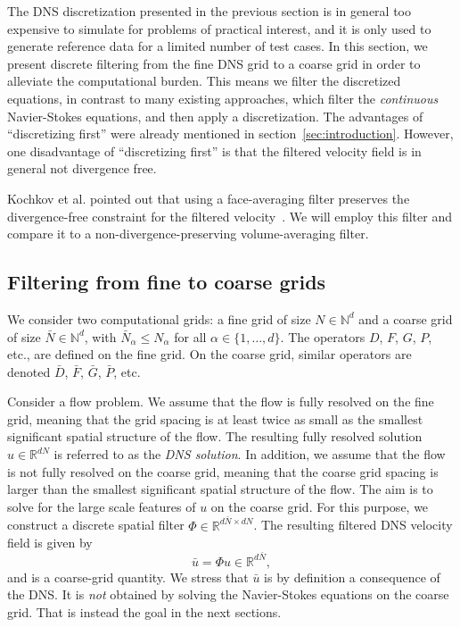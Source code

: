 \documentclass[preprint]{elsarticle}
\newcommand{\R}[1]{}
\newcommand{\revone}[1]{#1}
\begin{document}
The DNS discretization presented in the previous section is in general too
expensive to simulate for problems of practical interest, and it is only used to
generate reference data for a limited number of test cases. In this section, we
present discrete filtering from the fine DNS grid to a coarse grid in order to
alleviate the computational burden. This means we filter the discretized
equations, in contrast to many existing approaches, which filter the
\textit{continuous} Navier-Stokes equations, and then apply a discretization.
The advantages of ``discretizing first'' were already mentioned in
section~\ref{sec:introduction}.
However, one disadvantage of ``discretizing first'' is
that the filtered velocity field is in general not divergence free.
\R{novel3}
\revone{
    
    Kochkov et al. pointed out that using a face-averaging filter preserves the
    divergence-free constraint for the filtered velocity~\cite{Kochkov2021}. We
    will employ this filter and compare it to a non-divergence-preserving
    volume-averaging filter.
}

\subsection{Filtering from fine to coarse grids}

We consider two computational grids: a fine grid of size $N \in \mathbb{N}^d$
and a coarse grid of size $\bar{N} \in \mathbb{N}^d$, with $\bar{N}_\alpha
\leq N_\alpha$ for all $\alpha \in \{1, \dots, d\}$. The operators $D$, $F$,
$G$, $P$, etc., are defined on the fine grid. On the coarse grid, similar
operators are denoted $\bar{D}$, $\bar{F}$, $\bar{G}$, $\bar{P}$, etc.

Consider a flow problem. We assume that the flow is fully resolved on the fine
grid, meaning that the grid spacing is at least twice as small as the smallest
significant spatial structure of the flow. The resulting fully resolved solution
$u \in \mathbb{R}^{d N}$ is referred to as the \emph{DNS solution}. In
addition, we assume that the flow is not fully resolved on the coarse grid,
meaning that the coarse grid spacing is larger than the smallest significant
spatial structure of the flow. The aim is to solve for the large scale features
of $u$ on the coarse grid. For this purpose, we construct a discrete spatial
filter $\Phi \in \mathbb{R}^{d \bar{N} \times d N}$. The resulting
filtered DNS velocity field is given by 
\begin{equation}
    \bar{u} = \Phi u \in \mathbb{R}^{d \bar{N}},
\end{equation}
and is a coarse-grid quantity. We stress that $\bar{u}$ is by definition a
consequence of the DNS. It is \textit{not} obtained by solving the Navier-Stokes
equations on the coarse grid. That is instead the goal in the next sections.
\end{document}
